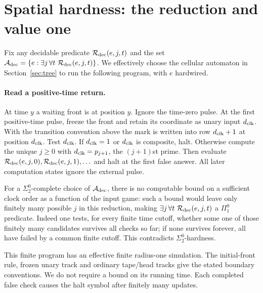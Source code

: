 \section{Spatial hardness: the reduction and value one}\label{sec:reduction}
Fix any decidable predicate $\mathcal R_{\rm dec}(e,j,t)$ and the set $\Adec=\{e:\exists j\,\forall t\ \Rdec(e,j,t)\}$. We effectively choose the cellular automaton in Section~\ref{sec:tree} to run the following program, with $e$ hardwired.

\paragraph{Read a positive-time return.}
At time $y$ a waiting front is at position $y$. Ignore the time-zero pulse. At the first positive-time pulse, freeze the front and retain its coordinate as unary input ${d_{\rm clk}}$. With the transition convention above the mark is written into row ${d_{\rm clk}}+1$ at position ${d_{\rm clk}}$. Test ${d_{\rm clk}}$. If ${d_{\rm clk}}=1$ or ${d_{\rm clk}}$ is composite, halt. Otherwise compute the unique $j\geq0$ with ${d_{\rm clk}}=p_{j+1}$, the $(j+1)$st prime. Then evaluate $\mathcal R_{\rm dec}(e,j,0),\mathcal R_{\rm dec}(e,j,1),\ldots$ and halt at the first false answer. All later computation states ignore the external pulse.

For a $\Sigma^0_2$-complete choice of $\mathcal A_{\rm dec}$, there is no computable bound on a sufficient clock order as a function of the input game: such a bound would leave only finitely many possible $j$ in this reduction, making $\exists j\,\forall t\ \mathcal R_{\rm dec}(e,j,t)$ a $\Pi^0_1$ predicate. Indeed one tests, for every finite time cutoff, whether some one of those finitely many candidates survives all checks so far; if none survives forever, all have failed by a common finite cutoff. This contradicts $\Sigma^0_2$-hardness.

This finite program has an effective finite radius-one simulation. The initial-front rule, frozen unary track and ordinary tape/head tracks give the stated boundary conventions. We do not require a bound on its running time. Each completed false check causes the halt symbol after finitely many updates.

